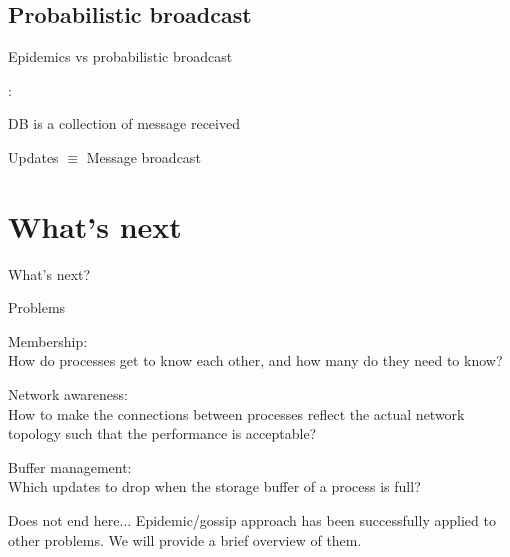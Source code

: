 \subsection{Probabilistic broadcast}

\begin{frame}{Epidemics vs probabilistic broadcast}
	
:

DB is a collection of message received

\bigskip
{}

Updates $\equiv$ Message broadcast

\end{frame}


\section{What's next}

\begin{frame}{What's next?}

\begin{block}{Problems}
\BI
\item \alert{Membership}:\\How do processes get to know each other, and how many do 
they need to know?
\item \alert{Network awareness}:\\ How to make the connections between processes reflect the actual 
network topology such that the performance is acceptable? 
\item \alert{Buffer management}:\\
Which updates to drop when the storage buffer of a process is full? 
\EI
\end{block}


\begin{block}{Does not end here...}
Epidemic/gossip approach has been successfully applied to other problems. 
We will provide a brief overview of them.
\end{block}

\end{frame}

\nocite{demers87}
\nocite{gossip11}
\ReadingMaterial


